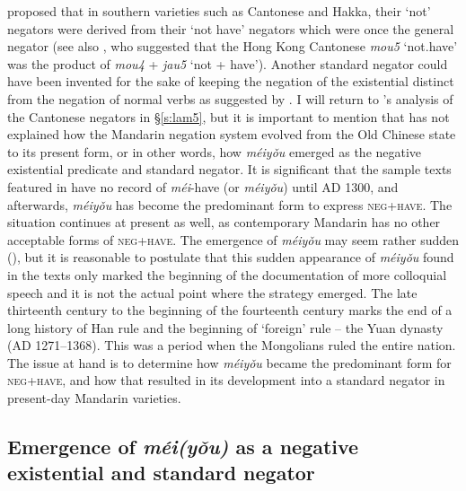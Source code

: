 \documentclass[output=paper,colorlinks,citecolor=brown,chinesefont]{langscibook}
\begin{document}
\citeauthor{Zhang2002} proposed that in southern varieties such as Cantonese and Hakka, their `not' negators were derived from their `not have' negators which were once the general negator (see also \citealt{Law2014}, who suggested that the Hong Kong Cantonese \textit{mou5} `not.have' was the product of \textit{mou4} + \textit{jau5} `not + have'). Another standard negator could have been invented for the sake of keeping the negation of the existential distinct from the negation of normal verbs as suggested by \citet{Veselinova2016}. I will return to \citeauthor{Zhang2002}'s analysis of the Cantonese negators in §\ref{s:lam5}, but it is important to mention that \citeauthor{Zhang2002} has not explained how the Mandarin negation system evolved from the Old Chinese state to its present form, or in other words, how \textit{méiyǒu} emerged as the negative existential predicate and standard negator. It is significant that the sample texts featured in  have no record of \textit{méi}-have (or \textit{méiyǒu}) until AD 1300, and afterwards, \textit{méiyǒu} has become the predominant form to express \textsc{neg}+\textsc{have}. The situation continues at present as well, as contemporary Mandarin has no other acceptable forms of \textsc{neg}+\textsc{have}. The emergence of \textit{méiyǒu} may seem rather sudden (), but it is reasonable to postulate that this sudden appearance of \textit{méiyǒu} found in the texts only marked the beginning of the documentation of more colloquial speech and it is not the actual point where the strategy emerged. The late thirteenth century to the beginning of the fourteenth century marks the end of a long history of Han rule and the beginning of `foreign' rule – the Yuan dynasty (AD 1271–1368). This was a period when the Mongolians ruled the entire nation. The issue at hand is to determine how \textit{méiyǒu} became the predominant form for \textsc{neg}+\textsc{have}, and how that resulted in its development into a standard negator in present-day Mandarin varieties.



\subsection{Emergence of \textit{méi(yǒu)} as a negative existential and standard negator}\label{s:lam4-2}
\end{document}
